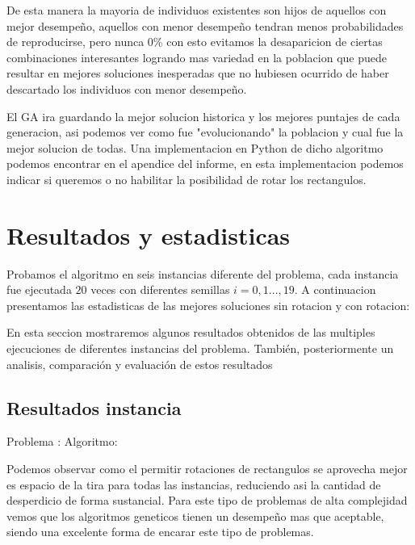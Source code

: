 \documentclass[10pt]{article}
\begin{document}
De esta manera la mayoria de individuos existentes son hijos de aquellos con mejor desempeño, aquellos con menor desempeño tendran menos probabilidades de reproducirse, pero nunca 0\% con esto evitamos la desaparicion de ciertas combinaciones interesantes logrando mas variedad en la poblacion que puede resultar en mejores soluciones inesperadas que no hubiesen ocurrido de haber descartado los individuos con menor desempeño.

El GA ira guardando la mejor solucion historica y los mejores puntajes de cada generacion, asi podemos ver como fue "evolucionando" la poblacion y cual fue la mejor solucion de todas. Una implementacion en Python de dicho algoritmo podemos encontrar en el apendice del informe, en esta implementacion podemos indicar si queremos o no habilitar la posibilidad de rotar los rectangulos.

\section{Resultados y estadisticas} %
 
Probamos el algoritmo en seis instancias diferente del problema, cada instancia fue ejecutada $20$ veces con diferentes semillas $i=0,1...,19$. A continuacion presentamos las estadisticas de las mejores soluciones sin rotacion y con rotacion:

\label{sec:Estadisticas}%

En esta seccion mostraremos algunos resultados obtenidos de las multiples ejecuciones de diferentes instancias del problema.%
También, posteriormente un analisis, comparación y evaluación de estos resultados%
\subsection{Resultados instancia}%

\label{subsec:}%

Problema :  \newline%
%
 Algoritmo: %


Podemos observar como el permitir rotaciones de rectangulos se aprovecha mejor es espacio de la tira para todas las instancias, reduciendo asi la cantidad de desperdicio de forma sustancial. Para este tipo de problemas de alta complejidad vemos que los algoritmos geneticos tienen un desempeño mas que aceptable, siendo una excelente forma de encarar este tipo de problemas.
\end{document}
